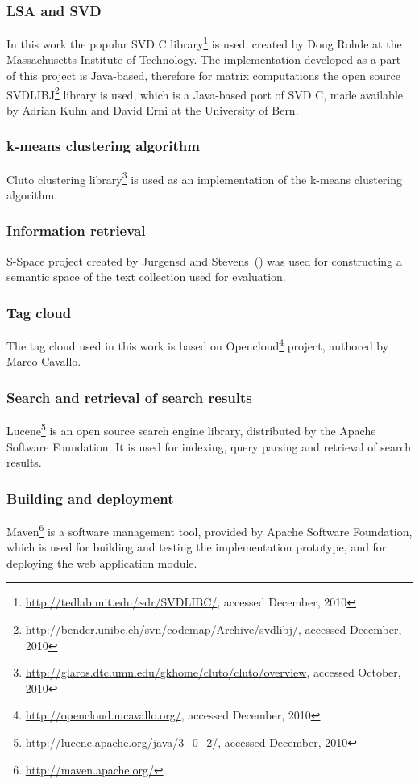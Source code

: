 \subsubsection{LSA and SVD}
In this work the popular SVD C library\footnote{\url{http://tedlab.mit.edu/~dr/SVDLIBC/}, accessed December, 2010}  is used, created by Doug Rohde at the Massachusetts Institute of Technology. The implementation developed as a part of this project is Java-based, therefore for matrix computations the open source SVDLIBJ\footnote{\url{http://bender.unibe.ch/svn/codemap/Archive/svdlibj/}, accessed December, 2010} library is used, which is a Java-based port of SVD C, made available by Adrian Kuhn and David Erni at the University of Bern. \\

\subsubsection{k-means clustering algorithm}
Cluto clustering library\footnote{\url{http://glaros.dtc.umn.edu/gkhome/cluto/cluto/overview}, accessed October, 2010} is used as an implementation of the k-means clustering algorithm.\\

\subsubsection{Information retrieval}
S-Space project created by  Jurgensd and Stevens~(\cite{S-Space}) was used for constructing a semantic space of the text collection used for evaluation. \\

\subsubsection{Tag cloud}
The tag cloud used in this work is based on Opencloud\footnote{\url{http://opencloud.mcavallo.org/}, accessed December, 2010} project, authored by Marco Cavallo.\\

\subsubsection{Search and retrieval of search results}
Lucene\footnote{\url{http://lucene.apache.org/java/3_0_2/}, accessed December, 2010} is an open source search engine library, distributed by the Apache Software Foundation. It is used for indexing, query parsing and retrieval of search results. \\

\subsubsection{Building and deployment}
Maven\footnote{\url{http://maven.apache.org/}} is a software management tool, provided by Apache Software Foundation, which is used for building and testing the implementation prototype, and for deploying the web application module.


